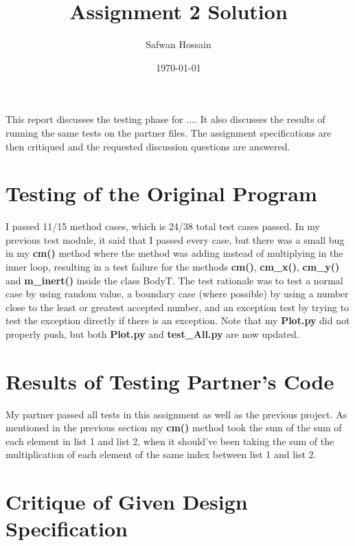 \documentclass[12pt]{article}
\title{Assignment 2 Solution}
\author{Safwan Hossain}
\date{\today}
\begin{document}
\maketitle

This report discusses the testing phase for .... It also discusses the results
of running the same tests on the partner files. The assignment specifications
are then critiqued and the requested discussion questions are answered.

\section{Testing of the Original Program}
	
	I passed 11/15 method cases, which is 24/38 total test cases passed. In my previous test module, it said that I passed every case, but there was a small bug in my \textbf{cm()} method where the method was adding instead of multiplying in the inner loop, resulting in a test failure for the methods \textbf{cm()}, \textbf{cm\_x()}, \textbf{cm\_y()} and \textbf{m\_inert()} inside the class BodyT. The test rationale was to test a normal case by using random value, a boundary case (where possible) by using a number close to the least or greatest accepted number, and an exception test by trying to test the exception directly if there is an exception. Note that my \textbf{Plot.py} did not properly push, but both \textbf{Plot.py} and \textbf{test\_All.py} are now updated.

\section{Results of Testing Partner's Code}
	
	My partner passed all tests in this assignment as well as the previous project. As mentioned in the previous section my \textbf{cm()} method took the sum of the sum of each element in list 1 and list 2, when it should’ve been taking the sum of the multiplication of each element of the same index between list 1 and list 2.

\section{Critique of Given Design Specification}
	
\end{document}
